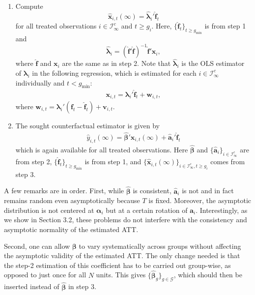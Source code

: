 \documentclass[12pt,fleqn]{article}
\def\*#1{\mathbf{#1}}
\def\+#1{\boldsymbol{#1}}
\begin{document}
\begin{enumerate}
\item Compute
\begin{equation}
    \widehat{\*x}_{i,t}(\infty) = \widehat{\+\lambda}_i'\widehat{\*f}_t
\end{equation}
for all treated observations $i\in \mathcal{I}_\infty^c$ and $t \geq g_i$. Here, $\{\widehat{\*f}_t\}_{t \geq g_{\min}}$ is from step 1 and
\begin{equation}
\widehat{\+\lambda}_i = ( \widehat{\*f}' \widehat{\*f} )^{-1} \widehat{\*f}' \*x_i,
\end{equation}
where $\widehat{\*f}$ and $\*x_i$ are the same as in step 2. Note that $\widehat{\+\lambda}_i$ is the OLS estimator of $\+\lambda_i$ in the following regression, which is estimated for each $i\in \mathcal{I}_\infty^c$ individually and $t < g_{\min}$:
\begin{align}
\*x_{i,t} = \+\lambda_i'\widehat{\*f}_t + \*w_{i,t},
\end{align}
where $\*w_{i,t} = \+\lambda_i'(\*f_t - \widehat{\*f}_t)  +  \*v_{i,t}$.

\item The sought counterfactual estimator is given by
\begin{align}
\widehat y_{i,t}(\infty) = \widehat{\+\beta}'\widehat{\*x}_{i,t}(\infty) + \widehat{\*a}_i'\widehat{\*f}_t
\end{align}
which is again available for all treated observations. Here $\widehat{\+\beta}$ and $\{\widehat{\*a}_i\}_{i\in \mathcal{I}_\infty^c}$ are from step 2, $\{\widehat{\*f}_t\}_{t \geq g_{\min}}$ is from step 1, and $\{\widehat{\*x}_{i,t}(\infty)\}_{i\in \mathcal{I}_\infty^c, t \geq g_i}$ comes from step 3.
\end{enumerate}

A few remarks are in order. First, while $\widehat{\+\beta}$ is consistent, $\widehat{\*a}_i$ is not and in fact remains random even asymptotically because $T$ is fixed. Moreover, the asymptotic distribution is not centered at $\+\alpha_i$ but at a certain rotation of $\*a_i$. Interestingly, as we show in Section 3.2, these problems do not interfere with the consistency and asymptotic normality of the estimated ATT.

Second, one can allow $\+\beta$ to vary systematically across groups without affecting the asymptotic validity of the estimated ATT. The only change needed is that the step-2 estimation of this coefficient has to be carried out group-wise, as opposed to just once for all $N$ units. This gives $\{\widehat{\+\beta}_g\}_{g\in \mathcal{G}}$, which should then be inserted instead of $\widehat{\+\beta}$ in step 3.
\end{document}
